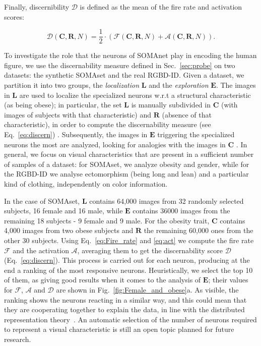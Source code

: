 \documentclass[10pt,journal,letterpaper,compsoc]{IEEEtran}
\begin{document}
Finally, discernibility $\mathcal{D}$  is defined as the mean of  the fire rate and activation scores:

\begin{equation}
\mathcal{D}(\mathbf{C},\mathbf{R},N) = \frac{1}{2} \cdot \left( \mathcal{F}(\mathbf{C},\mathbf{R},N) + \mathcal{A}(\mathbf{C},\mathbf{R},N) \right).
\label{eq:discern}
\end{equation}

To investigate the role that the neurons of SOMAnet play in encoding the human figure, we use the discernability measure defined in Sec.~\ref{sec:probe} on two datasets: the synthetic SOMAset and the real RGBD-ID. Given a dataset,
we partition it into two groups, the \emph{localization} $\mathbf{L}$ and the \emph{exploration} $\mathbf{E}$.  The images in $\mathbf{L}$ are used to localize the specialized neurons w.r.t a structural characteristic (as being obese);  in particular, the set $\mathbf{L}$ is manually subdivided in  $\mathbf{C}$ (with images of subjects with that characteristic) and $\mathbf{R}$ (absence of that characteristic), in order to compute the discernability measure  (see Eq.~\ref{eq:discern}) . Subsequently, the images in $\mathbf{E}$ triggering the specialized neurons the most are analyzed, looking for analogies with the images in $\mathbf{C}$ .
In general, we focus on visual characteristics that are present in a sufficient number of samples of a dataset: for SOMAset, we analyze obesity and gender, while for the RGBD-ID we analyse ectomorphism (being long and lean) and a particular kind of clothing, independently on color information.

In the case of SOMAset, $\mathbf{L}$ contains 64,000 images from 32 randomly selected subjects, 16 female and 16 male, while $\mathbf{E}$ contains 36000 images from the remaining 18 subjects - 9 female and 9 male.
For the obesity trait, $\mathbf{C}$ contains 4,000 images from two obese subjects and $\mathbf{R}$ the remaining 60,000 ones from the other 30 subjects. Using Eq.~\ref{eq:Fire_rate}  and \ref{eq:act} we compute the fire rate $\mathcal{F}$ and the activation $\mathcal{A}$, averaging them to get the discernability score $\mathcal{D}$ (Eq.~\ref{eq:discern}). This process is carried out for each neuron, producing at the end a ranking of the most responsive neurons. Heuristically, we select the top 10 of them, as giving good results when it comes to the analysis of $\mathbf{E}$; their values for $\mathcal{F}$, $\mathcal{A}$ and $\mathcal{D}$ are shown in Fig.~\ref{fig:Female_and_obese}a.
As visible, the ranking shows the neurons reacting in a similar way, and this could mean that they are cooperating together to explain the data, in line with the distributed representation theory~\cite{hinton1986,plate2002,valdez2015distributed}. An automatic selection of the number of neurons required to represent a visual characteristic is still an open topic planned for future research.
\end{document}
